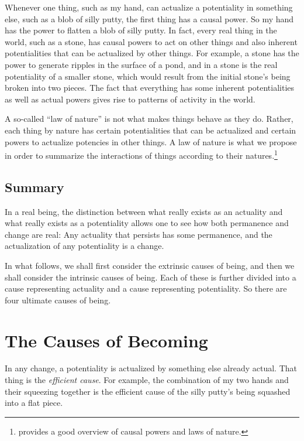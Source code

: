 \documentclass[twocolumn]{article}
\begin{document}
Whenever one thing, such as my hand, can actualize a potentiality in something
else, such as a blob of silly putty, the first thing has a causal power.  So my
hand has the power to flatten a blob of silly putty.  In fact, every real thing
in the world, such as a stone, has causal powers to act on other things and
also inherent potentialities that can be actualized by other things.  For
example, a stone has the power to generate ripples in the surface of a pond,
and in a stone is the real potentiality of a smaller stone, which would result
from the initial stone's being broken into two pieces.  The fact that
everything has some inherent potentialities as well as actual powers gives rise
to patterns of activity in the world.

A so-called ``law of nature'' is not what makes things behave as they do.
Rather, each thing by nature has certain potentialities that can be actualized
and certain powers to actualize potencies in other things.  A law of nature is
what we propose in order to summarize the interactions of things according to
their natures.\footnote{%
   \citet[Section 1.2.2.4]{f2014} provides a good overview of causal powers and
   laws of nature.
}

\subsection{Summary}

In a real being, the distinction between what really exists as an actuality and
what really exists as a potentiality allows one to see how both permanence and
change are real:  Any actuality that persists has some permanence, and the
actualization of any potentiality is a change.

In what follows, we shall first consider the extrinsic causes of being,
and then we shall consider the intrinsic causes of being.  Each of these is
further divided into a cause representing actuality and a cause representing
potentiality. So there are four ultimate causes of being.

\section{The Causes of Becoming}

In any change, a potentiality is actualized by something else already actual.
That thing is the \emph{efficient cause}.  For example, the combination of my
two hands and their squeezing together is the efficient cause of the silly
putty's being squashed into a flat piece.
\end{document}
